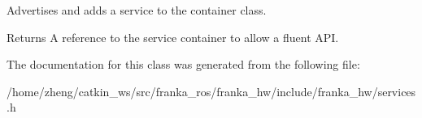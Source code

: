 Advertises and adds a service to the container class.

\begin{DoxyReturn}{Returns}
A reference to the service container to allow a fluent A\+PI. 
\end{DoxyReturn}


The documentation for this class was generated from the following file\+:\begin{DoxyCompactItemize}
\item 
/home/zheng/catkin\+\_\+ws/src/franka\+\_\+ros/franka\+\_\+hw/include/franka\+\_\+hw/services.\+h\end{DoxyCompactItemize}
